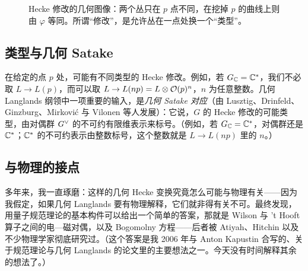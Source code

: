 \begin{figure}[htbp]
\centering
{}
\caption{Hecke 修改的几何图像：两个丛只在 $p$ 点不同，在挖掉 $p$ 的曲线上则由 $\varphi$ 等同。所谓“修改”，是允许丛在一点处换一个“类型”。}
\label{fig:hecke}
\end{figure}

\subsection{类型与几何 Satake}

在给定的点 $p$ 处，可能有不同类型的 Hecke 修改。例如，若 $G_{\mathbb{C}}=\mathbb{C}^*$，我们不必取 $L\to L(p)$，而可以取 $L\to L(np)=L\otimes\mathcal{O}(p)^n$，$n$ 为任意整数。几何 Langlands 纲领中一项重要的输入，是\emph{几何 Satake 对应}（由 Lusztig、Drinfeld、Ginzburg、Mirković 与 Vilonen 等人发展）：它说，$G$ 的 Hecke 修改的可能类型，由对偶群 $G^{\vee}$ 的不可约有限维表示来标号。（例如，若 $G_{\mathbb{C}}=\mathbb{C}^*$，对偶群还是 $\mathbb{C}^*$；$\mathbb{C}^*$ 的不可约表示由整数标号，这个整数就是 $L\to L(np)$ 里的 $n$。）

\subsection{与物理的接点}

多年来，我一直琢磨：这样的几何 Hecke 变换究竟怎么可能与物理有关——因为我假定，如果几何 Langlands 要有物理解释，它们就非得有关不可。最终发现，用量子规范理论的基本构件可以给出一个简单的答案，那就是 Wilson 与 't Hooft 算子之间的电—磁对偶，以及 Bogomolny 方程——后者被 Atiyah、Hitchin 以及不少物理学家彻底研究过。（这个答案是我 2006 年与 Anton Kapustin 合写的、关于规范理论与几何 Langlands 的论文里的主要想法之一。今天没有时间解释其余的想法了。）

